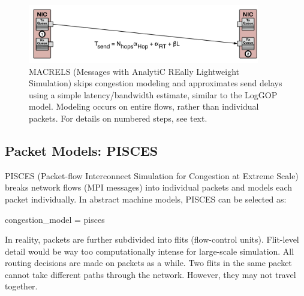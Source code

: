 \begin{figure}
\centering
\includegraphics[width=0.9\textwidth]{figures/macrels.pdf}
\caption{MACRELS (Messages with AnalytiC REally Lightweight Simulation) skips congestion modeling and approximates send delays using a simple latency/bandwidth estimate, similar to the LogGOP model. Modeling occurs on entire flows, rather than individual packets. For details on numbered steps, see text.}
\label{fig:macrelsOverview}
\end{figure}


\subsection{Packet Models: PISCES}
\label{subsec:tutorial:pisces}

PISCES (Packet-flow Interconnect Simulation for Congestion at Extreme Scale) breaks network flows (MPI messages) into individual packets and models each packet individually.
In abstract machine models, PISCES can be selected as:

\begin{ViFile}
congestion_model = pisces
\end{ViFile}
In reality, packets are further subdivided into flits (flow-control units).
Flit-level detail would be way too computationally intense for large-scale simulation.
All routing decisions are made on packets as a while. 
Two flits in the same packet cannot take different paths through the network.
However, they may not travel together.

